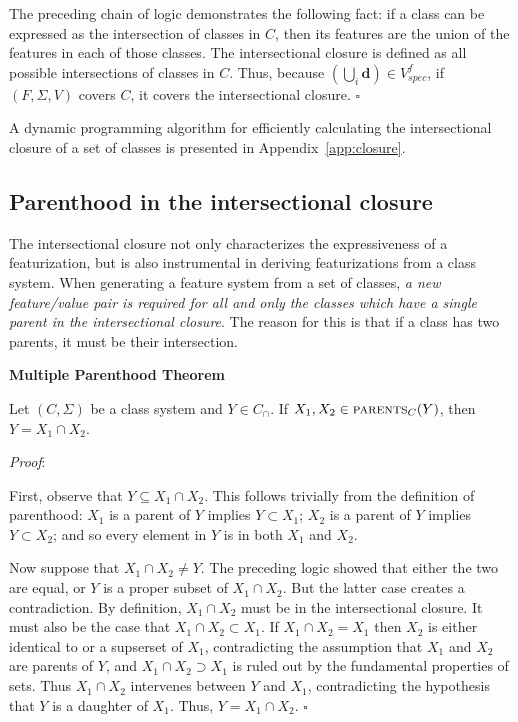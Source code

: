 \documentclass[12pt, oneside]{article}   	%
\newenvironment{clump}
{
	\edef\myindent{\the\parindent}
	\noindent\begin{minipage}{\textwidth}
	\setlength\parindent{\myindent}\fussy
}
{
	\end{minipage}
}
\begin{document}
\noindent The preceding chain of logic demonstrates the following fact: if a class can be expressed as the intersection of classes in $C$, then its features are the union of the features in each of those classes. The intersectional closure is defined as all possible intersections of classes in $C$. Thus, because $(\bigcup_i \mathbf{d}) \in V_{spec}^f$, if $(F, \Sigma, V)$ covers $C$, it covers the intersectional closure. $\square$

\vspace{0.5\baselineskip} A dynamic programming algorithm for efficiently calculating the intersectional closure of a set of classes is presented in Appendix~\ref{app:closure}.

\subsection{Parenthood in the intersectional closure}
\label{sec:intersection_proof}

The intersectional closure not only characterizes the expressiveness of a featurization, but is also instrumental in deriving featurizations from a class system. When generating a feature system from a set of classes, \textit{a new feature/value pair is required for all and only the classes which have a single parent in the intersectional closure}. The reason for this is that if a class has two parents, it must be their intersection.

\begin{clump}
\vspace{\baselineskip} \noindent \textbf{Multiple Parenthood Theorem}

\noindent Let $(C, \Sigma)$ be a class system and $Y \in C_\cap$. If $X_1, X_2 \in \textsc{parents}_C(Y)$, then $Y = X_1 \cap X_2$.
\end{clump}

\noindent \textit{Proof}:

First, observe that $Y \subseteq X_1 \cap X_2$. This follows trivially from the definition of parenthood: $X_1$ is a parent of $Y$ implies $Y \subset X_1$; $X_2$ is a parent of $Y$ implies $Y \subset X_2$; and so every element in $Y$ is in both $X_1$ and $X_2$.

Now suppose that $X_1 \cap X_2 \neq Y$. The preceding logic showed that either the two are equal, or $Y$ is a proper subset of $X_1 \cap X_2$. But the latter case creates a contradiction. By definition, $X_1 \cap X_2$ must be in the intersectional closure. It must also be the case that $X_1 \cap X_2 \subset X_1$. If $X_1 \cap X_2 = X_1$ then $X_2$ is either identical to or a supserset of $X_1$, contradicting the assumption that $X_1$ and $X_2$ are parents of $Y$, and $X_1 \cap X_2 \supset X_1$ is ruled out by the fundamental properties of sets. Thus $X_1 \cap X_2$ intervenes between $Y$ and $X_1$, contradicting the hypothesis that $Y$ is a daughter of $X_1$. Thus, $Y = X_1 \cap X_2$. $\square$
\end{document}
